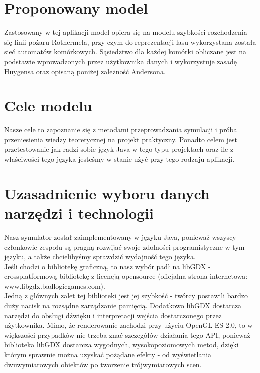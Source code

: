 \documentclass[a4paper, 11pt]{article}
\begin{document}
	\section{Proponowany model}
	\indent
	
		Zastosowany w tej aplikacji model opiera się na modelu szybkości rozchodzenia się linii pożaru Rothermela, przy czym do reprezentacji lasu wykorzystana została sieć automatów komórkowych. Sąsiedztwo dla każdej komórki obliczane jest na podstawie wprowadzonych przez użytkownika danych i wykorzystuje zasadę Huygensa oraz opisaną poniżej zależność Andersona. \\
		
	\section*{Cele modelu}
	\indent
	
	Nasze cele to zapoznanie się z metodami przeprowadzania symulacji i próba przeniesienia wiedzy teoretycznej na projekt praktyczny. Ponadto celem jest przetestowanie jak radzi sobie język Java w tego typu projektach oraz ile z właściwości tego języka jesteśmy w stanie użyć przy tego rodzaju aplikacji.
	
	\section*{Uzasadnienie wyboru danych narzędzi i technologii}
	\indent
		
		Nasz symulator został zaimplementowany w języku Java, ponieważ wszyscy członkowie zespołu są pragną rozwijać swoje zdolności programistyczne w tym języku, a także chcielibyśmy sprawdzić wydajność tego języka.\\
		
		Jeśli chodzi o bibliotekę graficzną, to nasz wybór padł na libGDX - crossplatformową bibliotekę z licencją opensource (oficjalna strona internetowa: www.libgdx.badlogicgames.com). \\
		
		Jedną z głównych zalet tej biblioteki jest jej szybkość - twórcy postawili bardzo duży nacisk na rozsądne zarządzanie pamięcią.  Dodatkowo libGDX dostarcza narzędzi do obsługi dźwięku i interpretacji wejścia dostarczonego przez użytkownika. Mimo, że renderowanie zachodzi przy użyciu OpenGL ES 2.0, to w większości przypadków nie trzeba znać szczegółów działania tego API, ponieważ biblioteka libGDX dostarcza wygodnych, wysokopoziomowych metod, dzięki którym sprawnie można uzyskać pożądane efekty - od wyświetlania dwuwymiarowych obiektów po tworzenie trójwymiarowych scen.\\
		
\end{document}
